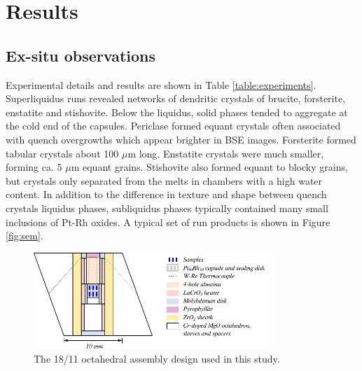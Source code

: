 \documentclass[review]{elsarticle}
\begin{document}
\clearpage
\section{Results}
\subsection{Ex-situ observations}
Experimental details and results are shown in Table \ref{table:experiments}. Superliquidus runs revealed networks of dendritic crystals of brucite, forsterite, enstatite and stishovite. Below the liquidus, solid phases tended to aggregate at the cold end of the capsules. Periclase formed equant crystals often associated with quench overgrowths which appear brighter in BSE images. Forsterite formed tabular crystals about 100 $\mu$m long. Enstatite crystals were much smaller, forming ca. 5 $\mu$m equant grains. Stishovite also formed equant to blocky grains, but crystals only separated from the melts in chambers with a high water content. In addition to the difference in texture and shape between quench crystals liquidus phases, subliquidus phases typically contained many small inclusions of Pt-Rh oxides. A typical set of run products is shown in Figure \ref{fig:sem}.

\begin{figure}[h!]
  \centering
      \includegraphics[width=0.8\textwidth]{figures/assembly}
  \caption{The 18/11 octahedral assembly design used in this study.}
  \label{fig:assembly}
\end{figure}
\end{document}
